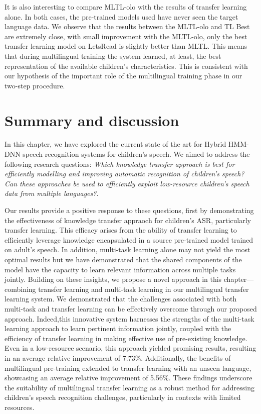 It is also interesting to compare MLTL-olo with the results of transfer learning alone. In both cases, the pre-trained models used have never seen the target language data. We observe that the results between the MLTL-olo and TL Best are extremely close, with small improvement with the MLTL-olo, only the best transfer learning model on LetsRead is slightly better than MLTL. This means that during multilingual training the system learned, at least, the best representation of the available children's characteristics. This is consistent with our hypothesis of the important role of the multilingual training phase in our two-step procedure.

\section{Summary and discussion}
In this chapter, we have explored the current state of the art for Hybrid HMM-DNN speech recognition systems for children's speech. We aimed to address the following research questions: \textit{Which knowledge transfer approach is best for efficiently modelling and improving automatic recognition of children's speech? Can these approaches be used to efficiently exploit low-resource children's speech data from multiple languages?}.

Our results provide a positive response to these questions, first by demonstrating the effectiveness of knowledge transfer appraoch for children's ASR, particularly transfer learning. This efficacy arises from the ability of transfer learning to efficiently leverage knowledge encapsulated in a source pre-trained model trained on adult's speech. In addition, multi-task learning alone may not yield the most optimal results but we have demonstrated that the shared components of the model have the capacity to learn relevant information across multiple tasks jointly. Building on these insights, we propose a novel approach in this chapter—combining transfer learning and multi-task learning in our multilingual transfer learning system. We demonstrated that the challenges associated with both multi-task and transfer learning can be effectively overcome through our proposed approach. Indeed,this innovative system harnesses the strengths of the multi-task learning approach to learn pertinent information jointly, coupled with the efficiency of transfer learning in making effective use of pre-existing knowledge. Even in a low-resource scenario, this approach yielded promising results, resulting in an average relative improvement of 7.73\%. Additionally, the benefits of multilingual pre-training extended to transfer learning with an unseen language, showcasing an average relative improvement of 5.56\%. These findings underscore the suitability of multilingual transfer learning as a robust method for addressing children's speech recognition challenges, particularly in contexts with limited resources.

